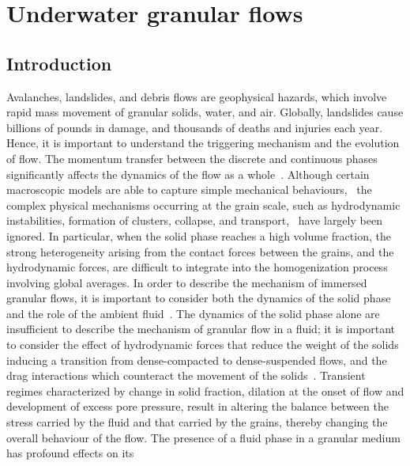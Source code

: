 \chapter{Underwater granular flows}

\ifpdf
    \graphicspath{{Chapter6/figs/raster/}{Chapter6/figs/pdf/}{Chapter6/figs/}}
\else
    \graphicspath{{Chapter6/figs/vector/}{Chapter6/figs/}}
\fi

\section{Introduction}

Avalanches, landslides, and debris flows are geophysical hazards, which involve 
rapid mass movement of granular solids, water, and air. Globally, landslides 
cause billions of pounds in damage, and thousands of deaths and injuries each 
year. Hence, it is important to understand the triggering mechanism and the 
evolution of flow. The momentum transfer between the discrete and continuous 
phases significantly affects the dynamics of the flow as a 
whole~\citep{Topin2012}. Although 
certain macroscopic models are able to capture simple mechanical 
behaviours,~\citep{Peker2007} the complex physical mechanisms occurring at the 
grain scale, such as hydrodynamic instabilities, formation of clusters, 
collapse, and transport,~\citep{Topin2011} have largely been ignored. In 
particular, when the solid phase reaches a high volume fraction, the strong 
heterogeneity arising from the contact forces between the grains, and the 
hydrodynamic forces, are difficult to integrate into the homogenization process 
involving global averages. In order to describe the mechanism of immersed 
granular flows, it is important to consider both the dynamics of the solid 
phase and the role of the ambient fluid~\citep{Denlinger2001}. The dynamics of 
the solid phase alone are insufficient to describe the mechanism of granular 
flow in a fluid; it is important to consider the effect of hydrodynamic forces 
that reduce the weight of the solids inducing a transition from dense-compacted 
to dense-suspended flows, and the drag interactions which counteract the 
movement of the solids~\citep{Meruane2010}. Transient regimes characterized by 
change in solid fraction, dilation at the onset of flow and development of 
excess pore pressure, result in altering the balance between the stress carried 
by the fluid and that carried by the grains, thereby changing the overall 
behaviour of the flow. 
The presence of a fluid phase in a granular medium has profound effects on its 
